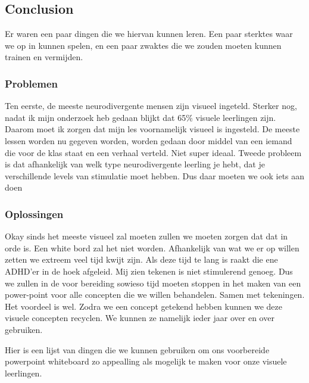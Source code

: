         \subsection{Conclusion}
            Er waren een paar dingen die we hiervan kunnen leren. Een paar sterktes waar we op in kunnen spelen, en een paar zwaktes die we zouden moeten kunnen trainen en vermijden.

            \subsubsection{Problemen}
                Ten eerste, de meeste neurodivergente mensen zijn visueel ingeteld. Sterker nog, nadat ik mijn onderzoek heb gedaan blijkt dat 65\% visuele leerlingen zijn.\cite{Visual-Learners-are-the-most-common} Daarom moet ik zorgen dat mijn les voornamelijk visueel is ingesteld. De meeste lessen worden nu gegeven worden, worden gedaan door middel van een iemand die voor de klas staat en een verhaal verteld. Niet super ideaal. Tweede probleem is dat afhankelijk van welk type neurodivergente leerling je hebt, dat je verschillende levels van stimulatie moet hebben. Dus daar moeten we ook iets aan doen
            
            \subsubsection{Oplossingen}
                Okay sinds het meeste visueel zal moeten zullen we moeten zorgen dat dat in orde is. Een white bord zal het niet worden. Afhankelijk van wat we er op willen zetten we extreem veel tijd kwijt zijn. Als deze tijd te lang is raakt die ene ADHD'er in de hoek afgeleid. Mij zien tekenen is niet stimulerend genoeg. Dus we zullen in de voor bereiding sowieso tijd moeten stoppen in het maken van een power-point voor alle concepten die we willen behandelen. Samen met tekeningen. Het voordeel is wel. Zodra we een concept getekend hebben kunnen we deze visuele concepten recyclen. We kunnen ze namelijk ieder jaar over en over gebruiken. 
                
                \bigskip
                
                \noindent Hier is een lijst van dingen die we kunnen gebruiken om ons voorbereide powerpoint whiteboard zo appealling als mogelijk te maken voor onze visuele leerlingen.
                
